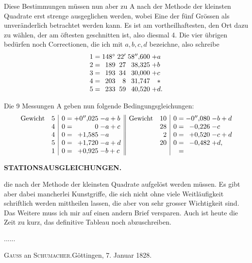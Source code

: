 Diese Bestimmungen müssen nun aber zu  A nach der Methode der kleinsten Quadrate erst strenge ausgeglichen werden, wobei Eine der fünf Grössen als unveränderlich betrachtet werden kann. Es ist am vortheilhaftesten, den Ort dazu zu wählen, der am öftesten geschnitten ist, also diesmal 4. Die vier übrigen bedürfen noch Correctionen, die ich mit \(a,b,c,d\) bezeichne, also schreibe
\[
\begin{array}{@{}r@{\;=\;}r@{\;}r@{\;}r@{\;}l@{}}
 1&148^\circ&22'&58''{,}600&+a\\
 2&189&27&38{,}325&+b\\
 3&193&34&30{,}000&+c\\
 4&203&8&31{,}747&\phantom{+}*\\
 5&233&59&40{,}520&+d.
\end{array}
\]

Die 9 Messungen A geben nun folgende Bedingungsgleichungen:
\[
\begin{array}{@{}lr|r@{\;=\;}r@{\;}l||lr|r@{\;=\;}r@{\;}l@{}}
 \text{Gewicht}&5&0&+0''{,}025&-a+b&
 \text{Gewicht}&10&0&-0''{,}080&-b+d\\
 &4&0&0&-a+c&&28&0&-0{,}226&-c\\
 &4&0&+1{,}585&-a&&2&0&+0{,}520&-c+d\\
 &5&0&+1{,}720&-a+d&&20&0&-0{,}482&+d,\\
 &1&0&+0{,}925&-b+c&&&&&
\end{array}
\]

\par\clearpage
\noindent\null\hfill{\small\textbf{STATIONSAUSGLEICHUNGEN.}}\hfill{}\par\medskip

\noindent die nach der Methode der kleinsten Quadrate aufgelöst werden müssen. Es gibt aber dabei mancherlei Kunstgriffe, die sich nicht ohne viele Weitläufigkeit schriftlich werden mittheilen lassen, die aber von sehr grosser Wichtigkeit sind. Das Weitere muss ich mir auf einen andern Brief versparen. Auch ist heute die Zeit zu kurz, das definitive Tableau noch abzuschreiben.

.\enspace.\enspace.\enspace.\enspace.\enspace.

\vspace{1.4cm}
\begin{center}
 \textsc{Gauss} an \textsc{Schumacher}.\quad Göttingen, 7. Januar 1828.
\end{center}

